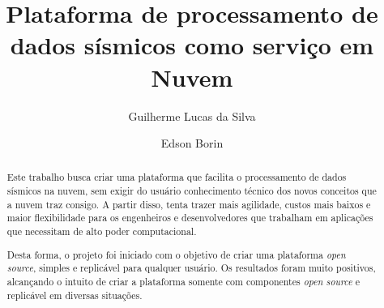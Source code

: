 \documentclass[11pt,twoside]{article}
\begin{document}
% 

%



\TRMakeCover


%
\pagestyle{myheadings}

%
\title{Plataforma de processamento de dados sísmicos como serviço em Nuvem}

\author{Guilherme Lucas da Silva \and Edson Borin}

\date{}

\maketitle


\begin{abstract} 
  Este trabalho busca criar uma plataforma que facilita o 
  processamento de dados sísmicos na nuvem, sem exigir do usuário conhecimento técnico dos
  novos conceitos que a nuvem traz consigo. A partir disso, tenta trazer
  mais agilidade, custos mais baixos e maior flexibilidade para os 
  engenheiros e desenvolvedores que trabalham em aplicações que 
  necessitam de alto poder computacional.

  Desta forma, o projeto foi iniciado com o objetivo de criar uma plataforma
  \emph{open source}, simples e replicável para qualquer 
  usuário. Os resultados foram muito positivos, alcançando o intuito de criar
  a plataforma somente com componentes \emph{open source} e replicável em
  diversas situações.
\end{abstract}
\end{document}
